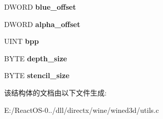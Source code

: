 \begin{DoxyCompactItemize}
D\+W\+O\+RD {\bfseries blue\+\_\+offset}
\item 
\mbox{\label{structwined3d__format__channels_a95c32facb91ecd39226d1e7d90f25a91}} 
D\+W\+O\+RD {\bfseries alpha\+\_\+offset}
\item 
\mbox{\label{structwined3d__format__channels_add27b8b61c924b5eb7167a8618e14e15}} 
U\+I\+NT {\bfseries bpp}
\item 
\mbox{\label{structwined3d__format__channels_a6a31abbe983fe0e552a91780f482dd36}} 
B\+Y\+TE {\bfseries depth\+\_\+size}
\item 
\mbox{\label{structwined3d__format__channels_a6ff0a7e15230d34b0a80e864111e469c}} 
B\+Y\+TE {\bfseries stencil\+\_\+size}
\end{DoxyCompactItemize}


该结构体的文档由以下文件生成\+:\begin{DoxyCompactItemize}
\item 
E\+:/\+React\+O\+S-\/0../dll/directx/wine/wined3d/utils.\+c\end{DoxyCompactItemize}
